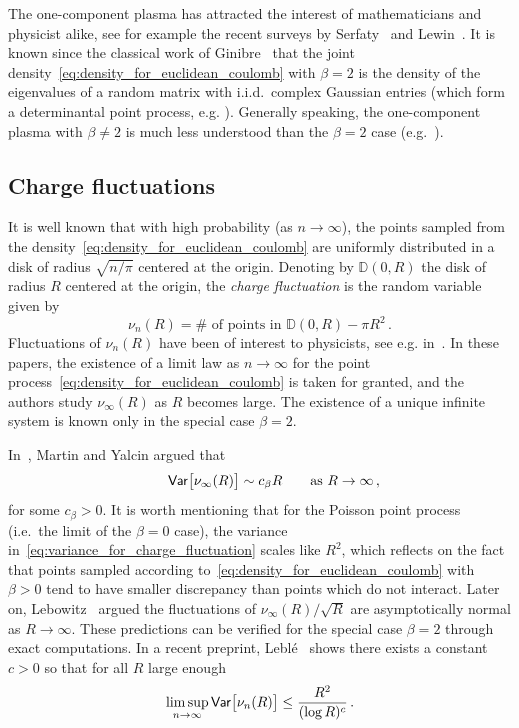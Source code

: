 \documentclass[11pt]{amsart}
\theoremstyle{definition}
\theoremstyle{remark}
\numberwithin{equation}{section}
\newcommand{\bD}{\mathbb D}
\newcommand{\Var}{{\sf Var}}
\begin{document}
	The one-component plasma has attracted the interest of mathematicians and physicist alike, see for example the recent surveys by Serfaty~\cite{SerfatyICM} and Lewin~\cite{Lewin}. It is known since the classical work of Ginibre~\cite{Ginibre} that the joint density~\eqref{eq:density_for_euclidean_coulomb} with $\beta=2$ is the density of the eigenvalues of a random matrix with i.i.d.\ complex Gaussian entries (which form a determinantal point process, e.g. \cite[Sec.~6.4]{GAFbook}). Generally speaking, the one-component plasma with $\beta \ne 2$ is much less understood than the $\beta=2$ case (e.g.~\cite[Sec.~4]{GinibreSurvey22}). 
	
	\subsection{Charge fluctuations}
	It is well known that with high probability (as $n\to \infty$), the points sampled from the density~\eqref{eq:density_for_euclidean_coulomb} are uniformly distributed in a disk of radius $\sqrt{n/\pi}$ centered at the origin. Denoting by $\bD(0,R)$ the disk of radius $R$ centered at the origin, the \emph{charge fluctuation} is the random variable given by
	\begin{equation*}
		\label{eq:charge_fluc_for_euclidean_coulomb}
		\nu_n(R) = \# \text{ of points in } \bD(0,R) - \pi R^2\, .
	\end{equation*}
	Fluctuations of $\nu_{n}(R)$ have been of interest to physicists, see e.g. in~\cite{MartinYalcin,Lebowitz,JLM}. In these papers, the existence of a limit law as $n\to \infty$ for the point process~\eqref{eq:density_for_euclidean_coulomb} is taken for granted, and the authors study $\nu_\infty(R)$ as $R$ becomes large. The existence of a unique infinite system is known  only in the special case $\beta=2$. 
	
	In~\cite{MartinYalcin}, Martin and Yalcin argued that 
	\begin{equation}
		\label{eq:variance_for_charge_fluctuation}
		\qquad \Var\big[\nu_\infty(R)\big] \sim c_\beta R \qquad \text{as   } R\to \infty \, ,
	\end{equation}
	for some $c_\beta>0$.
	It is worth mentioning that for the Poisson point process (i.e.\ the limit of the $\beta=0$ case), the variance in~\eqref{eq:variance_for_charge_fluctuation} scales like $R^2$, which reflects on the fact that points sampled according to~\eqref{eq:density_for_euclidean_coulomb} with $\beta>0$ tend to have smaller discrepancy than points which do not interact. Later on, Lebowitz~\cite{Lebowitz} argued the fluctuations of $\nu_\infty(R)/\sqrt{R}$ are asymptotically normal as $R\to \infty$.
	These predictions can be verified for the special case $\beta=2$ through exact computations. 
	In a recent preprint, Lebl\'e~\cite{Leble} shows there exists a constant $c>0$ so that for all $R$ large enough
	\[
	\limsup_{n\to \infty} \Var\big[\nu_n(R)\big] \le \frac{R^2}{(\log R)^c}\, .
	\]
\end{document}
